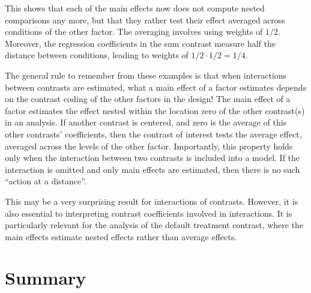 \documentclass[12pt,]{krantz}
\theoremstyle{definition}
\theoremstyle{definition}
\theoremstyle{definition}
\theoremstyle{remark}
\begin{document}
This shows that each of the main effects now does not compute nested
comparisons any more, but that they rather test their effect averaged
across conditions of the other factor. The averaging involves using
weights of \(1/2\). Moreover, the regression coefficients in the sum
contrast measure half the distance between conditions, leading to
weights of \(1/2 \cdot 1/2 = 1/4\).

The general rule to remember from these examples is that when
interactions between contrasts are estimated, what a main effect of a
factor estimates depends on the contrast coding of the other factors in
the design! The main effect of a factor estimates the effect nested
within the location zero of the other contrast(s) in an analysis. If
another contrast is centered, and zero is the average of this other
contrasts' coefficients, then the contrast of interest tests the average
effect, averaged across the levels of the other factor. Importantly,
this property holds only when the interaction between two contrasts is
included into a model. If the interaction is omitted and only main
effects are estimated, then there is no such ``action at a distance''.

This may be a very surprising result for interactions of contrasts.
However, it is also essential to interpreting contrast coefficients
involved in interactions. It is particularly relevant for the analysis
of the default treatment contrast, where the main effects estimate
nested effects rather than average effects.

\section{Summary}\label{summary-3}
\end{document}
